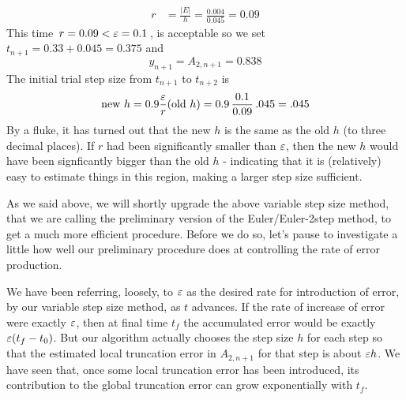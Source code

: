 \begin{eg}
\begin{align*}
r&=\frac{|E|}{h}=\frac{0.004}{0.045}=0.09
\end{align*}
This time $\,r=0.09<\varepsilon=0.1\,$, is acceptable
so we set $t_{n+1}=0.33+0.045=0.375$ and 
\begin{equation*}
y_{n+1}=A_{2,n+1}=0.838
\end{equation*}
The initial trial step size from $t_{n+1}$ to $t_{n+2}$ is
\begin{equation*}
\text{new }h = 0.9\frac{\varepsilon}{r}(\text{old }h)
  =0.9\,\frac{0.1}{0.09}\,.045=.045
\end{equation*}
By a fluke, it has turned out that the new $h$ is the same as the old $h$ (to three decimal places). If $r$ had been significantly smaller than $\varepsilon$, then the new $h$ would have been signficantly bigger than the old $h$ - indicating that it is (relatively) easy to estimate things in this region, making a larger step size sufficient.
\end{eg}

As we said above, we will shortly upgrade the above variable step size method,
that we are calling the preliminary version of the Euler/Euler-2step method,  
to get a much more efficient procedure. Before we do so, let's pause 
to investigate a little how well our preliminary procedure does at 
controlling the rate of error production.
 
We have been referring, loosely, to $\varepsilon$ as the desired rate for introduction
of error, by our variable step size method, as $t$ advances. 
If the rate of increase of error were exactly $\varepsilon$, then at final time
$t_f$ the accumulated error would be exactly $\varepsilon(t_f-t_0)$. But our 
algorithm actually chooses the step size $h$ for each step so that the 
estimated local truncation error in $A_{2,n+1}$ for that step is about 
$\varepsilon h$. We have seen that, once some local truncation error has been 
introduced, its contribution to the global truncation error can 
grow exponentially with $t_f$.

